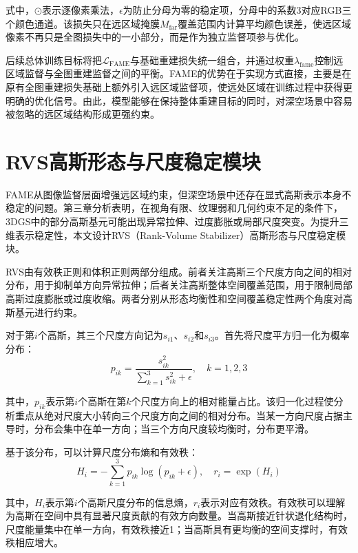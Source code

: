 式中，$\odot$表示逐像素乘法，$\epsilon$为防止分母为零的稳定项，分母中的系数3对应RGB三个颜色通道。该损失只在远区域掩膜$M_{\mathrm{far}}$覆盖范围内计算平均颜色误差，使远区域像素不再只是全图损失中的一小部分，而是作为独立监督项参与优化。

后续总体训练目标将把$\mathcal{L}_{\mathrm{FAME}}$与基础重建损失统一组合，并通过权重$\lambda_{\mathrm{fame}}$控制远区域监督与全图重建监督之间的平衡。FAME的优势在于实现方式直接，主要是在原有全图重建损失基础上额外引入远区域监督项，使远处区域在训练过程中获得更明确的优化信号。由此，模型能够在保持整体重建目标的同时，对深空场景中容易被忽略的远区域结构形成更强约束。

\section{RVS高斯形态与尺度稳定模块}

FAME从图像监督层面增强远区域约束，但深空场景中还存在显式高斯表示本身不稳定的问题。第三章分析表明，在视角有限、纹理弱和几何约束不足的条件下，3DGS中的部分高斯基元可能出现异常拉伸、过度膨胀或局部尺度突变。为提升三维表示稳定性，本文设计RVS（Rank-Volume Stabilizer）高斯形态与尺度稳定模块。

RVS由有效秩正则和体积正则两部分组成。前者关注高斯三个尺度方向之间的相对分布，用于抑制单方向异常拉伸；后者关注高斯整体空间覆盖范围，用于限制局部高斯过度膨胀或过度收缩。两者分别从形态均衡性和空间覆盖稳定性两个角度对高斯基元进行约束。

对于第$i$个高斯，其三个尺度方向记为$s_{i1}$、$s_{i2}$和$s_{i3}$。首先将尺度平方归一化为概率分布：
\begin{equation}
    p_{ik}=\frac{s_{ik}^2}{\sum_{k=1}^{3}s_{ik}^2+\epsilon},\quad k=1,2,3
\end{equation}

其中，$p_{ik}$表示第$i$个高斯在第$k$个尺度方向上的相对能量占比。该归一化过程使分析重点从绝对尺度大小转向三个尺度方向之间的相对分布。当某一方向尺度占据主导时，分布会集中在单一方向；当三个方向尺度较均衡时，分布更平滑。

基于该分布，可以计算尺度分布熵和有效秩：
\begin{equation}
    H_i=-\sum_{k=1}^{3}p_{ik}\log(p_{ik}+\epsilon),\quad r_i=\exp(H_i)
\end{equation}

其中，$H_i$表示第$i$个高斯尺度分布的信息熵，$r_i$表示对应有效秩。有效秩可以理解为高斯在空间中具有显著尺度贡献的有效方向数量。当高斯接近针状退化结构时，尺度能量集中在单一方向，有效秩接近1；当高斯具有更均衡的空间支撑时，有效秩相应增大。

